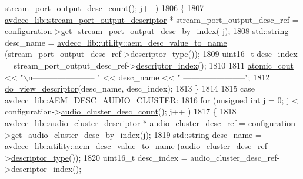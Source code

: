 \begin{DoxyCode}
      \hyperlink{classavdecc__lib_1_1configuration__descriptor_a58cdf6527f31108945befa42ef682f2b}{stream\_port\_output\_desc\_count}(); j++)
1806         \{
1807             \hyperlink{classavdecc__lib_1_1stream__port__output__descriptor}{avdecc\_lib::stream\_port\_output\_descriptor} * 
      stream\_port\_output\_desc\_ref = configuration->\hyperlink{classavdecc__lib_1_1configuration__descriptor_afc0e79843f9b98263f9be9d16197310b}{get\_stream\_port\_output\_desc\_by\_index}(
      j);
1808             std::string desc\_name = \hyperlink{namespaceavdecc__lib_1_1utility_a6bdd02679e5a911a071d4aa03be341f0}{avdecc\_lib::utility::aem\_desc\_value\_to\_name}
      (stream\_port\_output\_desc\_ref->\hyperlink{classavdecc__lib_1_1descriptor__base_a5112b70022171063ec5d3242bee9910e}{descriptor\_type}());
1809             uint16\_t desc\_index = stream\_port\_output\_desc\_ref->\hyperlink{classavdecc__lib_1_1descriptor__base_a7eed5583bffdf72d89021b188648c1b5}{descriptor\_index}();
1810 
1811             \hyperlink{cmd__line_8h_a0bc38ccc65c79ba06c6fcd7b4bf554c3}{atomic\_cout} << \textcolor{stringliteral}{"\(\backslash\)n----------------------- "} << desc\_name << \textcolor{stringliteral}{"
       -----------------------"};
1812             \hyperlink{classcmd__line_aef7d9f8c4eff85c46e5b7aea0961bb51}{do\_view\_descriptor}(desc\_name, desc\_index);
1813         \}
1814 
1815     \textcolor{keywordflow}{case} \hyperlink{namespaceavdecc__lib_ac7b7d227e46bc72b63ee9e9aae15902fa84158b480b7b6ff17f874ab717903428}{avdecc\_lib::AEM\_DESC\_AUDIO\_CLUSTER}:
1816         \textcolor{keywordflow}{for} (\textcolor{keywordtype}{unsigned} \textcolor{keywordtype}{int} j = 0; j < configuration->\hyperlink{classavdecc__lib_1_1configuration__descriptor_a4fb6d1822e990aca2ea3993effbea267}{audio\_cluster\_desc\_count}(); j++
      )
1817         \{
1818             \hyperlink{classavdecc__lib_1_1audio__cluster__descriptor}{avdecc\_lib::audio\_cluster\_descriptor} * 
      audio\_cluster\_desc\_ref = configuration->\hyperlink{classavdecc__lib_1_1configuration__descriptor_a36bc7f659fca61d1057b4250d4a92ca8}{get\_audio\_cluster\_desc\_by\_index}(j);
1819             std::string desc\_name = \hyperlink{namespaceavdecc__lib_1_1utility_a6bdd02679e5a911a071d4aa03be341f0}{avdecc\_lib::utility::aem\_desc\_value\_to\_name}
      (audio\_cluster\_desc\_ref->\hyperlink{classavdecc__lib_1_1descriptor__base_a5112b70022171063ec5d3242bee9910e}{descriptor\_type}());
1820             uint16\_t desc\_index = audio\_cluster\_desc\_ref->\hyperlink{classavdecc__lib_1_1descriptor__base_a7eed5583bffdf72d89021b188648c1b5}{descriptor\_index}();

\end{DoxyCode}
